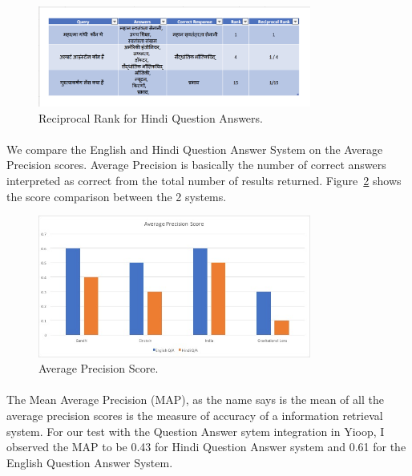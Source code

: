 \begin{figure}[htb]
\centering
\includegraphics[width=0.8\textwidth]{images/score_table.jpg}
\caption{Reciprocal Rank for Hindi Question Answers.} 
\label{fig:score_table}
\end{figure}

\paragraph{}
We compare the English and Hindi Question Answer System on the  Average Precision scores. Average  Precision is basically the number of correct answers interpreted as correct from the total number of results returned. Figure~\ref{fig:AveragePrecisionScore} shows the score comparison between the 2 systems.

\begin{figure}[htb]
\centering
\includegraphics[width=0.8\textwidth]{images/AveragePrecisionScore.jpg}
\caption{Average Precision Score.} 
\label{fig:AveragePrecisionScore}
\end{figure}

\paragraph{}
The Mean Average Precision (MAP), as the name says is the mean of all the average precision scores is the measure of accuracy of a information retrieval system. For our test with the Question Answer sytem integration in Yioop,  I observed the MAP to be 0.43 for Hindi Question Answer system and 0.61 for the English Question Answer System.

